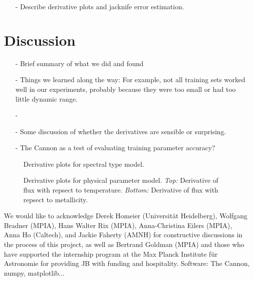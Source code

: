 \documentclass[modern]{aastex62}
\begin{document}
\begin{enumerate}
\item[-] Describe derivative plots and jacknife error estimation.
\end{enumerate}



\section{Discussion} \label{sec:discussion}

\begin{enumerate}
\item[-] Brief summary of what we did and found

\item[-] Things we learned along the way: For example, not all training sets worked well in our experiments, probably because they were too small or had too little dynamic range.

\item[-] \color{gcolor}{HOGG: Some discussion of precision and accuracy: The Cannon can produce precise results, but is only as accurate as its training set.}\color{black}

\item[-] Some discussion of whether the derivatives are sensible or surprising. \color{red}{Add derivative plots.}\color{black}

\item[-] The Cannon as a test of evaluating training parameter accuracy? 
\end{enumerate}

\begin{figure}[ht]
\caption{Derivative plots for spectral type model.} \label{fig:west_derivative}
\end{figure}

\begin{figure}[ht]
\caption{Derivative plots for physical parameter model. \textit{Top:} Derivative of flux with repsect to temperature. \textit{Bottom:} Derivative of flux with repsect to metallicity.} \label{fig:mann_derivative}
\end{figure}


\acknowledgements
We would like to acknowledge Derek Homeier (Universit{\"a}t Heidelberg), Wolfgang Bradner (MPIA), Hans Walter Rix (MPIA), Anna-Christina Eilers (MPIA), Anna Ho (Caltech), and Jackie Faherty (AMNH) for constructive discussions in the process of this project, as well as Bertrand Goldman (MPIA) and those who have supported the internship program at the Max Planck Institute f{\"u}r Astronomie for providing JB with funding and hospitality. \color{red}Software: The Cannon, numpy, matplotlib... \color{black}

\color{gcolor}{HOGG: SDSS acknowledgments... Grants and stuff...}\color{black}  

\clearpage


\end{document}
